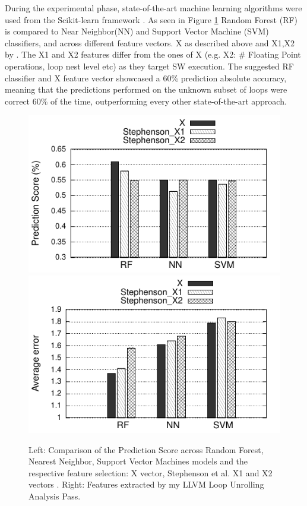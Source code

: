\documentclass[]{usiinfthesis}
\begin{document}
During the experimental phase, state-of-the-art machine learning algorithms were used from the 
Scikit-learn framework \cite{pedregosa2011scikit}.
As seen in Figure \ref{fig:mod_score} Random Forest (RF) is compared to Near Neighbor(NN) and
Support Vector Machine (SVM) classifiers, and across different feature vectors. X as described
above and X1,X2 by \cite{StephensonApr05}. The X1 and X2 features differ from the ones of X (e.g. X2: \# 
Floating Point operations, loop nest level etc) as they target 
SW execution. The suggested RF classifier and X feature vector 
showcased a 60\% prediction absolute accuracy, meaning that the predictions performed on the unknown 
subset of loops were correct 60\% of the time, outperforming every other state-of-the-art approach.



\begin{figure}

\centering
\includegraphics[width= .6 \linewidth]{figs/models_score}
\includegraphics[width= .6 \linewidth]{figs/models_error}
\vspace*{-0.2cm}
\caption{Left: Comparison of the Prediction Score across Random Forest, Nearest Neighbor, Support Vector Machines models 
and the respective feature selection: X vector, Stephenson et al. X1 and X2 vectors \cite{StephensonApr05}.
Right: Features extracted by my LLVM Loop Unrolling Analysis Pass.}
\label{fig:mod_score}
\end{figure}
\end{document}
